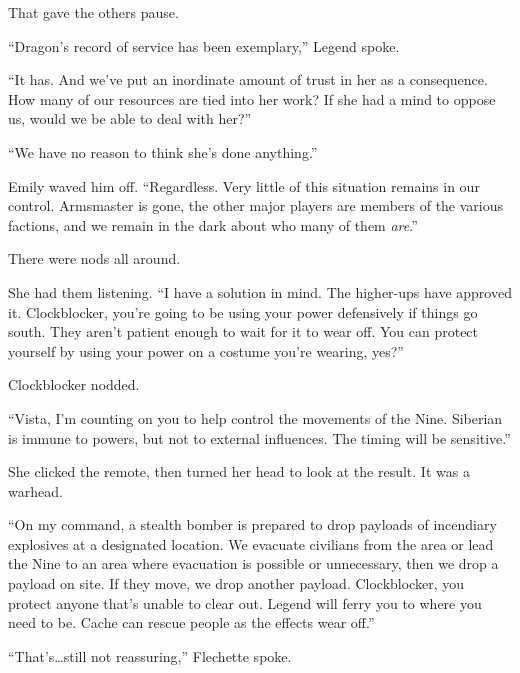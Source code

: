 That gave the others pause.



``Dragon's record of service has been exemplary,'' Legend spoke.



``It has.  And we've put an inordinate amount of trust in her as a consequence.  How many of our resources are tied into her work?  If she had a mind to oppose us, would we be able to deal with her?''



``We have no reason to think she's done anything.''



Emily waved him off.  ``Regardless.  Very little of this situation remains in our control.  Armsmaster is gone, the other major players are members of the various factions, and we remain in the dark about who many of them \emph{are}.''



There were nods all around.



She had them listening.  ``I have a solution in mind.  The higher-ups have approved it.  Clockblocker, you're going to be using your power defensively if things go south.  They aren't patient enough to wait for it to wear off.  You can protect yourself by using your power on a costume you're wearing, yes?''



Clockblocker nodded.



``Vista, I'm counting on you to help control the movements of the Nine.  Siberian is immune to powers, but not to external influences.  The timing will be sensitive.''



She clicked the remote, then turned her head to look at the result.  It was a warhead.



``On my command, a stealth bomber is prepared to drop payloads of incendiary explosives at a designated location.  We evacuate civilians from the area or lead the Nine to an area where evacuation is possible or unnecessary, then we drop a payload on site.  If they move, we drop another payload.  Clockblocker, you protect anyone that's unable to clear out.  Legend will ferry you to where you need to be.  Cache can rescue people as the effects wear off.''



``That's\ldots still not reassuring,'' Flechette spoke.



